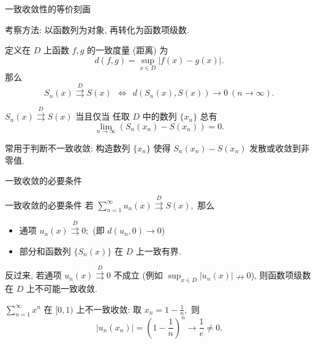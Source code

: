 
\begin{frame}{一致收敛性的等价刻画}

考察方法: 以函数列为对象, 再转化为函数项级数.

\pause
\vspace{1em}

\begin{thm}[一致度量判别法]
定义在 $D$ 上函数 $f, g$ 的一致度量 (距离) 为
\[d(f, g) = \sup_{x \in D} \lvert f(x) - g(x) \rvert.\]
那么
\[S_n(x) \stackrel{D}{\rightrightarrows} S(x) ~~ \Longleftrightarrow ~~ d(S_n(x), S(x)) \to 0 \ (n \to \infty).\]
\end{thm}

\pause

\begin{thm}[数列判别法]
$S_n(x) \stackrel{D}{\rightrightarrows} S(x)$ 当且仅当 任取 $D$ 中的数列 $\{x_n\}$ 总有
\[\lim_{n\to\infty} (S_n(x_n) - S(x_n)) = 0.\]
\end{thm}

\pause

{\color{red}常用于判断不一致收敛}: 构造数列 $\{x_n\}$ 使得 $S_n(x_n) - S(x_n)$ 发散或收敛到非零值.

\end{frame}


\begin{frame}{一致收敛的必要条件}

\begin{block}{一致收敛的必要条件}
若 $\sum_{n=1}^\infty u_n(x) \stackrel{D}{\rightrightarrows} S(x),$ 那么
\begin{itemize}
\item 通项 $u_n(x) \stackrel{D}{\rightrightarrows} 0;$ (即 $d(u_n, 0) \to 0$)
\pause
\item 部分和函数列 $\{S_n(x)\}$ 在 $D$ 上一致有界.
\end{itemize}
\end{block}

\pause
\vspace{1em}

反过来, 若通项 $u_n(x) \stackrel{D}{\rightrightarrows} 0$ 不成立 (例如 $\sup_{x \in D} |u_n(x)| \nrightarrow 0$), 则函数项级数在 $D$ 上不可能一致收敛.

\pause

\begin{eg}
$\sum_{n=1}^\infty x^n$ 在 $[0, 1)$ 上不一致收敛: 取 $x_n = 1 - \frac{1}{n},$ 则
\[|u_n(x_n)| = \left(1 - \frac{1}{n}\right)^n \to \frac{1}{e} \neq 0.\]
\end{eg}

\end{frame}

